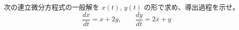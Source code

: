 
次の連立微分方程式の一般解を $x(t)$, $y(t)$ の形で求め、導出過程を示せ。
\[
\frac{dx}{dt} = x + 2y, \qquad \frac{dy}{dt} = 2x + y
\]
